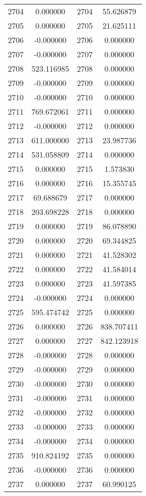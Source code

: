 \documentclass[12pt]{article}
\begin{document}
\begin{longtable}{@{}cccc@{}}
2704 & 0.000000 & 2704 & 55.626879 \\
2705 & 0.000000 & 2705 & 21.625111 \\
2706 & -0.000000 & 2706 & 0.000000 \\
2707 & -0.000000 & 2707 & 0.000000 \\
2708 & 523.116985 & 2708 & 0.000000 \\
2709 & -0.000000 & 2709 & 0.000000 \\
2710 & -0.000000 & 2710 & 0.000000 \\
2711 & 769.672061 & 2711 & 0.000000 \\
2712 & -0.000000 & 2712 & 0.000000 \\
2713 & 611.000000 & 2713 & 23.987736 \\
2714 & 531.058809 & 2714 & 0.000000 \\
2715 & 0.000000 & 2715 & 1.573830 \\
2716 & 0.000000 & 2716 & 15.355745 \\
2717 & 69.688679 & 2717 & 0.000000 \\
2718 & 203.698228 & 2718 & 0.000000 \\
2719 & 0.000000 & 2719 & 86.078890 \\
2720 & 0.000000 & 2720 & 69.344825 \\
2721 & 0.000000 & 2721 & 41.528302 \\
2722 & 0.000000 & 2722 & 41.584014 \\
2723 & 0.000000 & 2723 & 41.597385 \\
2724 & -0.000000 & 2724 & 0.000000 \\
2725 & 595.474742 & 2725 & 0.000000 \\
2726 & 0.000000 & 2726 & 838.707411 \\
2727 & 0.000000 & 2727 & 842.123918 \\
2728 & -0.000000 & 2728 & 0.000000 \\
2729 & -0.000000 & 2729 & 0.000000 \\
2730 & -0.000000 & 2730 & 0.000000 \\
2731 & -0.000000 & 2731 & 0.000000 \\
2732 & -0.000000 & 2732 & 0.000000 \\
2733 & -0.000000 & 2733 & 0.000000 \\
2734 & -0.000000 & 2734 & 0.000000 \\
2735 & 910.824192 & 2735 & 0.000000 \\
2736 & -0.000000 & 2736 & 0.000000 \\
2737 & 0.000000 & 2737 & 60.990125 \\

\end{longtable}
\end{document}
